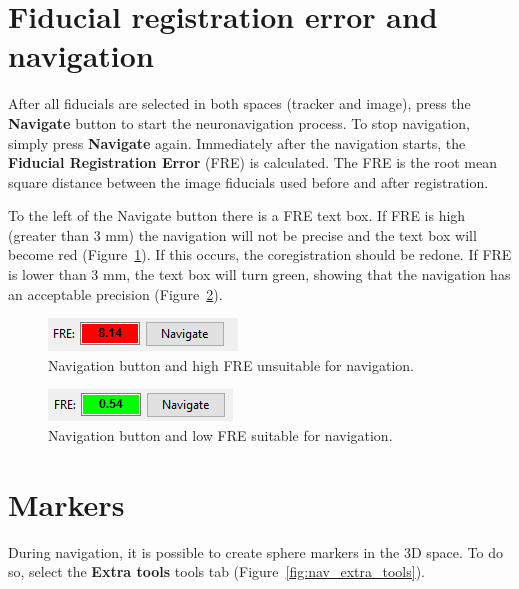 \section{Fiducial registration error and navigation}

After all fiducials are selected in both spaces (tracker and image), press the \textbf{Navigate} button to start the neuronavigation process. To stop navigation, simply press \textbf{Navigate} again. Immediately after the navigation starts, the \textbf{Fiducial Registration Error} (FRE) is calculated. The FRE is the root mean square distance between the image fiducials used before and after registration.


To the left of the Navigate button there is a FRE text box. If FRE is high (greater than 3 mm) the navigation will not be precise and the text box will become red (Figure~\ref{fig:nav_fre_error}). If this occurs, the coregistration should be redone. If FRE is lower than 3 mm, the text box will turn green, showing that the navigation has an acceptable precision (Figure~\ref{fig:nav_fre_ok}).

\begin{figure}[!htb]
\centering
\includegraphics[scale=0.6]{../user_guide_figures/invesalius_screen/nav_fre_error_en.png}
\caption{Navigation button and high FRE unsuitable for navigation.}
\label{fig:nav_fre_error}
\end{figure}

\begin{figure}[!htb]
\centering
\includegraphics[scale=0.6]{../user_guide_figures/invesalius_screen/nav_fre_ok_en.png}
\caption{Navigation button and low FRE suitable for navigation.}
\label{fig:nav_fre_ok}
\end{figure}

\section{Markers}

During navigation, it is possible to create sphere markers in the 3D space. To do so, select the \textbf{Extra tools} tools tab (Figure~\ref{fig:nav_extra_tools}).

